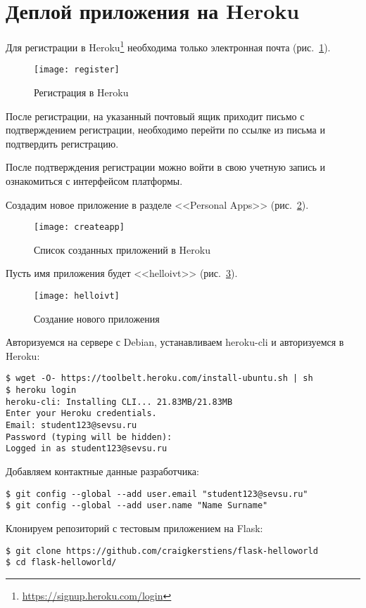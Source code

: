 \section{Деплой приложения на Heroku} \label{pril:e}

Для регистрации в Heroku\footnote{\url{https://signup.heroku.com/login}} необходима только электронная почта (рис.~\ref{pic:heroku_reg}).
\begin{figure}[ht]
    \centering
    \texttt{[image: register]}
    \caption{Регистрация в Heroku}\label{pic:heroku_reg}
\end{figure}

После регистрации, на указанный почтовый ящик приходит письмо с подтверждением регистрации, необходимо перейти по ссылке из письма и подтвердить регистрацию.

После подтверждения регистрации можно войти в свою учетную запись и ознакомиться с интерфейсом платформы.

Создадим новое приложение в разделе <<Personal Apps>> (рис.~\ref{pic:add_app}).
\begin{figure}[ht]
    \centering
    \texttt{[image: createapp]}
    \caption{Список созданных приложений в Heroku}\label{pic:add_app}
\end{figure}

Пусть имя приложения будет <<helloivt>> (рис.~\ref{pic:helloivt}).
\begin{figure}[ht]
    \centering
    \texttt{[image: helloivt]}
    \caption{Создание нового приложения}\label{pic:helloivt}
\end{figure}

Авторизуемся на сервере с Debian, устанавливаем heroku-cli и авторизуемся в Heroku:
\begin{lstlisting}
$ wget -O- https://toolbelt.heroku.com/install-ubuntu.sh | sh
$ heroku login
heroku-cli: Installing CLI... 21.83MB/21.83MB
Enter your Heroku credentials.
Email: student123@sevsu.ru
Password (typing will be hidden):
Logged in as student123@sevsu.ru
\end{lstlisting}

Добавляем контактные данные разработчика:
\begin{lstlisting}
$ git config --global --add user.email "student123@sevsu.ru"
$ git config --global --add user.name "Name Surname"
\end{lstlisting}

Клонируем репозиторий с тестовым приложением на Flask:
\begin{lstlisting}
$ git clone https://github.com/craigkerstiens/flask-helloworld
$ cd flask-helloworld/
\end{lstlisting}

